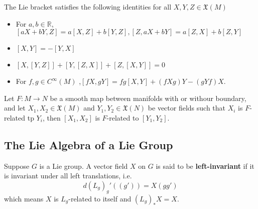 \begin{proposition}
    The Lie bracket satisfies the following identities for all $X,Y,Z \in \mathfrak{X}(M)$
    \begin{itemize}
        \item For $a,b\in\mathbb{R}$,$[aX+bY,Z] = a[X,Z] + b[Y,Z],
            [Z,aX+bY] = a[Z,X] + b[Z,Y]$
        \item $[X,Y] = -[Y,X]$
        \item $[X,[Y,Z]] + [Y,[Z,X]] + [Z,[X,Y]] = 0$
        \item For $f,g\in C^{\infty}(M)$
        ,$[fX,gY] = fg[X,Y] + (fXg)Y - (gYf)X$.
    \end{itemize}
\end{proposition}

\begin{proposition}
    Let $F:M\to N$ be a smooth map between manifolds with or withour boundary, and let $X_1,X_2\in\mathfrak{X}(M)$ and $Y_1,Y_2\in\mathfrak{X}(N)$ be vector fields such that $X_i$ is $F$-related tp $Y_i$, then $[X_1,X_2]$ is $F$-related to $[Y_1,Y_2]$.
\end{proposition}

\subsection{The Lie Algebra of a Lie Group}

\begin{definition}
    Suppose $G$ is a Lie group. A vector field $X$ on $G$ is said to be \textbf{left-invariant} if it is invariant under all left translations, i.e.
    \[d(L_g)_g'((g')) = X(gg')\]
    which means $X$ is $L_g$-related to itself and $(L_g)_*X = X$.
\end{definition}

